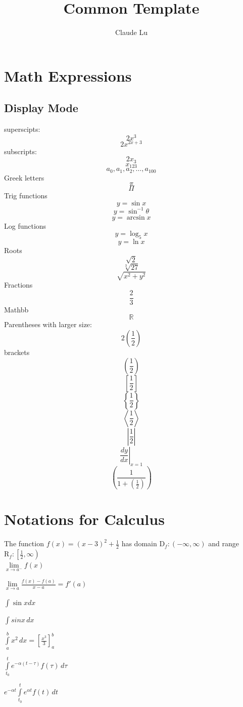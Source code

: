 \documentclass[12pt,a4paper]{article}
\title{Common Template}
\author{Claude Lu}
\begin{document}
\tableofcontents
\maketitle

\section{Math Expressions}
\subsection{Display Mode}
superscipts: $$2x^3$$
$$2x^{2x+3}$$
subscripts: $$2x_{3}$$
$$x_{123}$$
$$a_0, a_1, a_2, \ldots, a_{100}$$
Greek letters
$$\pi$$
$$\Pi$$
Trig functions
$$y=\sin x$$ %
$$y=\sin^{-1}\theta$$	
$$y=\arcsin x$$
Log functions
$$y=\log_5 x$$
$$y=\ln x$$
Roots
$$\sqrt{2}$$
$$\sqrt[3]{27}$$
$$\sqrt{x^2+y^2}$$
Fractions
$$\frac{2}{3}$$
Mathbb
$$\mathbb{R}$$
Parentheses with larger size: $$2\left(\frac{1}{2}\right)$$ %
brackets
$$\left( \frac{1}{2} \right)$$  	
$$\left[ \frac{1}{2} \right]$$
$$\left\{ \frac{1}{2} \right\}$$ %
$$\left \langle \frac{1}{2} \right \rangle$$
$$\left | \frac{1}{2} \right |$$
$$\left. \frac{dy}{dx}\right|_{x=1}$$ %
$$\left( \frac{1}{1+\left( \frac{1}{2} \right)} \right)$$ %
\section{Notations for Calculus}
The function $f(x)=(x-3)^2 + \frac{1}{2}$ has domain $\mathrm{D}_f:(-\infty,\infty)$ and range $\mathrm{R}_f:\left [\frac{1}{2},\infty\right )$\\

$\lim \limits_{x \to a^-} f(x)$ %

$\lim \limits_{x \to a} \frac{f(x)-f(a)}{x-a}=f'(a)$

$\int \sin xdx$

$\displaystyle{\int sinx \,dx}$ %

$\displaystyle{\int \limits_{a}^{b}x^{2} \,dx=\left [ \frac{x^{3}}{3} \right ]_{a}^{b}}$

$\displaystyle{\int \limits_{t_{0}}^{t}e^{-\alpha(t-\tau)}f(\tau)\,d\tau}$

$\displaystyle{e^{-\alpha t}\int \limits_{t_{0}}^{t}e^{\alpha t}f(t)\,dt}$
\end{document}
